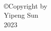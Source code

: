 \thispagestyle{empty}
\hbox{\ }

\vfill
\renewcommand{\baselinestretch}{1}
\small\normalsize

\vspace{.5in}

\begin{center}
\large{
    \copyright \hbox{}Copyright by\\
    Yipeng Sun  \\
    2023
}
\end{center}

\vfill

\newpage
